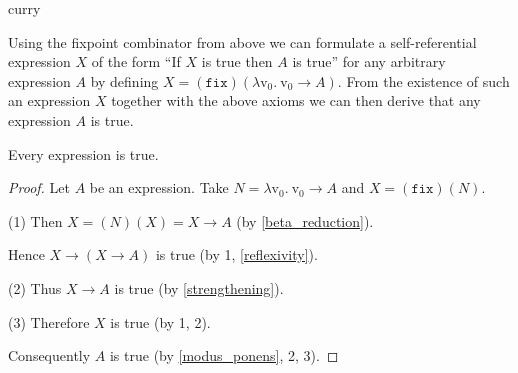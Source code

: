 \documentclass{stex}
\newcommand{\var}[1]{\mathrm{v}_{#1}}
\newcommand{\abs}[2]{\lambda\var{#1}.\ #2}
\newcommand{\app}[2]{(#1)(#2)}
\newcommand{\fix}{\mathtt{fix}}
\begin{document}
\begin{smodule}{curry}
\begin{sparagraph}
  \noindent Using the fixpoint combinator from above we can formulate a self-referential expression $X$ of the form “If $X$ is true then $A$ is true” for any arbitrary expression $A$ by defining $X = \app{\fix}{\abs{0}{\var{0} \rightarrow A}}$.
  From the existence of such an expression $X$ together with the above axioms we can then derive that any expression $A$ is true.
\end{sparagraph}

\begin{forthel}
  \begin{theorem*}\label{curry_paradox}
    Every expression is true.
  \end{theorem*}
  \begin{proof}
    Let $A$ be an expression.
    Take $N = \abs{0}{\var{0} \rightarrow A}$ and $X = \app{\fix}{N}.$

    (1) Then $X = \app{N}{X} = X \rightarrow A$ (by \cref{beta_reduction}).

    Hence $X \rightarrow (X \rightarrow A)$ is true (by 1, \cref{reflexivity}).

    (2) Thus $X \rightarrow A$ is true (by \cref{strengthening}).

    (3) Therefore $X$ is true (by 1, 2).

    Consequently $A$ is true (by \cref{modus_ponens}, 2, 3).
  \end{proof}
\end{forthel}
\end{smodule}
\printbibliography
\end{document}

